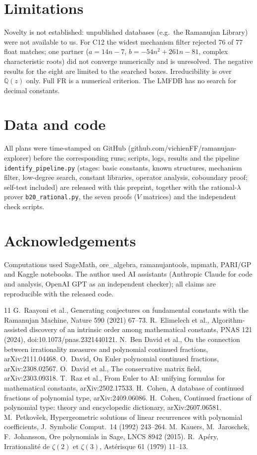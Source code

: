 \documentclass[11pt]{article}
\begin{document}
\section{Limitations}
Novelty is not established: unpublished databases (e.g.\ the Ramanujan Library) were not available to us. For C12 the widest
mechanism filter rejected 76 of 77 float matches; one partner ($a=14n-7$, $b=-54n^2+261n-81$, complex characteristic roots) did
not converge numerically and is unresolved. The negative results for the eight are limited to the searched boxes. Irreducibility is over
$\mathbb Q(z)$ only. Full FR is a numerical criterion. The LMFDB has no search for decimal constants.

\section*{Data and code}
All plans were time-stamped on GitHub (github.com/vichienFF/ramanujan-explorer) before the corresponding runs; scripts, logs,
results and the pipeline \texttt{identify\_pipeline.py} (stages: basic constants, known structures, mechanism filter, low-degree
search, constant libraries, operator analysis, coboundary proof; self-test included) are released with this preprint, together
with the rational-$\lambda$ prover \texttt{b20\_rational.py}, the seven proofs ($V$ matrices) and the independent check scripts.
\section*{Acknowledgements}
Computations used SageMath, ore\_algebra, ramanujantools, mpmath, PARI/GP and Kaggle notebooks. The author used AI assistants
(Anthropic Claude for code and analysis, OpenAI GPT as an independent checker); all claims are reproducible with the released code.

\begin{thebibliography}{11}
 G.~Raayoni et al., Generating conjectures on fundamental constants with the Ramanujan Machine, Nature 590 (2021) 67--73.
 R.~Elimelech et al., Algorithm-assisted discovery of an intrinsic order among mathematical constants, PNAS 121 (2024), doi:10.1073/pnas.2321440121.
 N.~Ben David et al., On the connection between irrationality measures and polynomial continued fractions, arXiv:2111.04468.
 O.~David, On Euler polynomial continued fractions, arXiv:2308.02567.
 O.~David et al., The conservative matrix field, arXiv:2303.09318.
 T.~Raz et al., From Euler to AI: unifying formulas for mathematical constants, arXiv:2502.17533.
 H.~Cohen, A database of continued fractions of polynomial type, arXiv:2409.06086.
 H.~Cohen, Continued fractions of polynomial type: theory and encyclopedic dictionary, arXiv:2607.06581.
 M.~Petkov\v sek, Hypergeometric solutions of linear recurrences with polynomial coefficients, J.\ Symbolic Comput.\ 14 (1992) 243--264.
 M.~Kauers, M.~Jaroschek, F.~Johansson, Ore polynomials in Sage, LNCS 8942 (2015).
 R.~Ap\'ery, Irrationalit\'e de $\zeta(2)$ et $\zeta(3)$, Ast\'erisque 61 (1979) 11--13.
\end{thebibliography}
\end{document}

